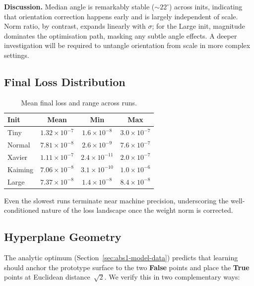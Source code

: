 \textbf{Discussion.}  
Median angle is remarkably stable ($\sim22^\circ$) across inits, indicating
that orientation correction happens early and is largely independent of scale.
Norm ratio, by contrast, expands linearly with $\sigma$; for the Large init,
magnitude dominates the optimisation path, masking any subtle angle effects.
A deeper investigation will be required to untangle orientation from scale in
more complex settings.

\subsection*{Final Loss Distribution}

\begin{table}[h]
\centering
\caption{Mean final loss and range across runs.}
\label{tab:abs1-init-loss}
\begin{tabular}{lccc}
\toprule
Init & Mean & Min & Max \\
\midrule
Tiny    & $1.32\times10^{-7}$ & $1.6\times10^{-8}$ & $3.0\times10^{-7}$ \\
Normal  & $7.81\times10^{-8}$ & $2.6\times10^{-9}$ & $7.6\times10^{-7}$ \\
Xavier  & $1.11\times10^{-7}$ & $2.4\times10^{-11}$ & $2.0\times10^{-7}$ \\
Kaiming & $7.06\times10^{-8}$ & $3.1\times10^{-10}$ & $1.0\times10^{-6}$ \\
Large   & $7.37\times10^{-8}$ & $1.4\times10^{-8}$ & $8.4\times10^{-8}$ \\
\bottomrule
\end{tabular}
\end{table}

Even the slowest runs terminate near machine precision, underscoring the
well-conditioned nature of the loss landscape once the weight norm is
corrected.

\subsection*{Hyperplane Geometry}
\label{sec:init-geometry}

The analytic optimum (Section~\ref{sec:abs1-model-data}) predicts that learning
should anchor the prototype surface to the two \textbf{False} points
and place the \textbf{True} points at Euclidean distance~$\sqrt2$.
We verify this in two complementary ways:

